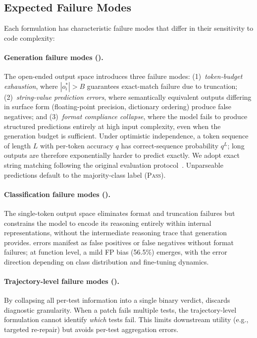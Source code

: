 \subsection{Expected Failure Modes}
\label{sec:failure-modes}

Each formulation has characteristic failure modes that differ in their sensitivity to code complexity:

\paragraph{Generation failure modes (\cwm{}).} The open-ended output space introduces three failure modes: (1)~\emph{token-budget exhaustion}, where $|o_i^*| > B$ guarantees exact-match failure due to truncation; (2)~\emph{string-value prediction errors}, where semantically equivalent outputs differing in surface form (floating-point precision, dictionary ordering) produce false negatives; and (3)~\emph{format compliance collapse}, where the model fails to produce structured predictions entirely at high input complexity, even when the generation budget is sufficient. Under optimistic independence, a token sequence of length $L$ with per-token accuracy $q$ has correct-sequence probability $q^L$; long outputs are therefore exponentially harder to predict exactly. We adopt exact string matching following the original \cwm{} evaluation protocol~\citep{meta2025cwm}. Unparseable predictions default to the majority-class label (\textsc{Pass}).

\paragraph{Classification failure modes (\cls{}).} The single-token output space eliminates format and truncation failures but constrains the model to encode its reasoning entirely within internal representations, without the intermediate reasoning trace that generation provides. \cls{} errors manifest as false positives or false negatives without format failures; at function level, a mild FP bias (56.5\%) emerges, with the error direction depending on class distribution and fine-tuning dynamics.

\paragraph{Trajectory-level failure modes (\traj{}).} By collapsing all per-test information into a single binary verdict, \traj{} discards diagnostic granularity. When a patch fails multiple tests, the trajectory-level formulation cannot identify \emph{which} tests fail. This limits downstream utility (e.g., targeted re-repair) but avoids per-test aggregation errors.

